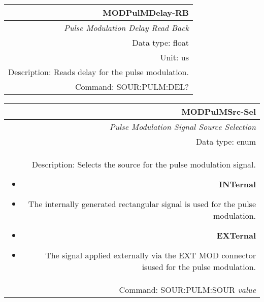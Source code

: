 \documentclass[openany]{article}
\begin{document}
		\begin{tabular}{N}
			\hline
			\bfseries MODPulMDelay-RB \\ \hline
			\emph{Pulse Modulation Delay Read Back} \\
			Data type: float \\
			Unit: us \\
			Description: Reads delay for the pulse modulation. \\
			Command: SOUR:PULM:DEL? \\

		\end{tabular}
%
		\begin{tabular}{N}
			\hline
			\bfseries MODPulMSrc-Sel \\ \hline
			\emph{Pulse Modulation Signal Source Selection} \\
			Data type: enum \\  
			Description: Selects the source for the pulse modulation signal.\begin{itemize}[noitemsep]
				\small
				\item[] \textbf{INTernal}
                                \item[] The internally generated rectangular signal is used for the pulse modulation.
                                \item[] \textbf{EXTernal}
                                \item[] The signal applied externally via the EXT MOD connector isused for the pulse modulation.
			\end{itemize} \\
			Command: SOUR:PULM:SOUR \emph{value} \\

		\end{tabular}
\end{document}
